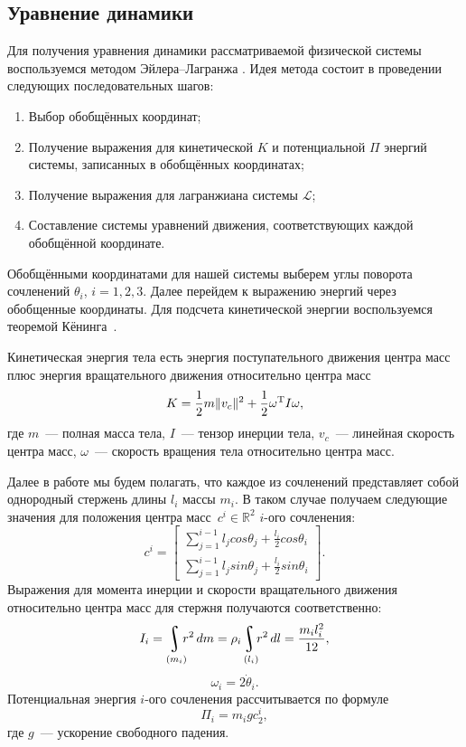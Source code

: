 \documentclass[../../doc.tex]{subfiles}
\begin{document}
    \subsection{Уравнение динамики}

    Для получения уравнения динамики рассматриваемой физической системы воспользуемся методом Эйлера--Лагранжа \cite{kolubin2017}.
    Идея метода состоит в проведении следующих последовательных шагов:
    \begin{enumerate}\itemsep0em 
        \item Выбор обобщённых координат;
        \item Получение выражения для кинетической $K$ и потенциальной $\Pi$ энергий системы, записанных в обобщённых координатах;
        \item Получение выражения для лагранжиана системы $\mathcal{L}$;
        \item Составление системы уравнений движения, соответствующих каждой обобщённой координате.
    \end{enumerate}

    Обобщёнными координатами для нашей системы выберем углы поворота сочленений $\theta_i$, $i = 1, 2, 3$.
    Далее перейдем к выражению энергий через обобщенные координаты.
    Для подсчета кинетической энергии воспользуемся теоремой Кёнинга~\cite{zhuravlev2001}.

    \begin{theorem}[Кёнинг]
        Кинетическая энергия тела есть энергия поступательного движения центра масс плюс энергия вращательного движения относительно центра масс
        \begin{equation}\label{eq:kin-energy}
            K = \frac{1}{2} m \|v_c\|^2 + \frac{1}{2}\omega^\textnormal{T} I \omega,
        \end{equation}
        где $m$~--- полная масса тела, $I$~--- тензор инерции тела, $v_c$~--- линейная скорость центра масс, $\omega$~--- скорость вращения тела относительно центра масс.
    \end{theorem}

    Далее в работе мы будем полагать, что каждое из сочленений представляет собой однородный стержень длины $l_i$ массы $m_i$.
    В таком случае получаем следующие значения для положения центра масс~$c^i \in \mathbb{R}^2$ $i$-ого сочленения:
    $$
        c^i =
        \left[\begin{aligned}
            \sum_{j=1}^{i-1} l_j cos\theta_j + \frac{l_i}{2}cos\theta_i \\
            \sum_{j=1}^{i-1} l_j sin\theta_j + \frac{l_i}{2}sin\theta_i
        \end{aligned}\right].
    $$
    Выражения для момента инерции и скорости вращательного движения относительно центра масс для стержня получаются соответственно:
    $$
        I_i
        =
        \uint\limits_{(m_i)}\!\!\! r^2\,dm
        =
        \rho_i\uint\limits_{(l_i)}\!\! r^2\,dl = \frac{m_il_i^2}{12},
    $$
    $$
        \omega_i = 2\dot \theta_i.
    $$
    Потенциальная энергия $i$-ого сочленения рассчитывается по формуле
    $$
        \Pi_i = m_i g c^i_2,
    $$
    где $g$~--- ускорение свободного падения.
\end{document}
